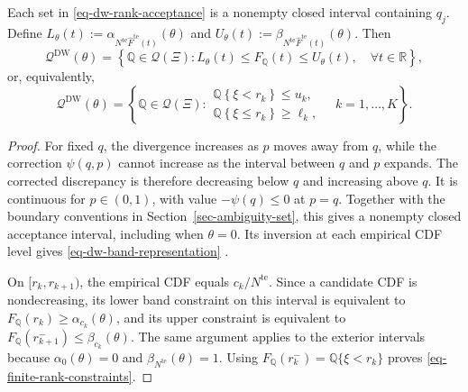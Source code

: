 \begin{proposition}
  \label{prop-finite-rank-constraints}
  Each set in \eqref{eq-dw-rank-acceptance} is a nonempty closed interval containing $q_j$. Define
  $L_\theta(t):=\alpha_{N^{\mathrm{te}}\widehat F^{\mathrm{te}}(t)}(\theta)$ and
  $U_\theta(t):=\beta_{N^{\mathrm{te}}\widehat F^{\mathrm{te}}(t)}(\theta)$.
  Then
  \begin{equation}
    \mathscr Q^{\mathrm{DW}}(\theta)
    =\left\{\mathbb Q\in\mathcal Q(\Xi):
    L_\theta(t)\le F_{\mathbb Q}(t)\le U_\theta(t),\quad\forall t\in\mathbb R\right\},
    \label{eq-dw-band-representation}
  \end{equation}
  or, equivalently,
  \begin{equation}
    \mathscr Q^{\mathrm{DW}}(\theta)
    =\left\{\mathbb Q\in\mathcal Q(\Xi):
    \begin{array}{l}
      \mathbb Q\left\{\xi<r_k\right\}\le u_k,\\
      \mathbb Q\left\{\xi\le r_k\right\}\ge\ell_k,
    \end{array}
    \quad k=1,\ldots,K\right\}.
    \label{eq-finite-rank-constraints}
  \end{equation}
\end{proposition}
\begin{proof}
  For fixed $q$, the divergence increases as $p$ moves away from $q$, while the correction $\psi(q,p)$ cannot increase as the interval between $q$ and $p$ expands. The corrected discrepancy is therefore decreasing below $q$ and increasing above $q$. It is continuous for $p\in(0,1)$, with value $-\psi(q)\le0$ at $p=q$. Together with the boundary conventions in Section~\ref{sec-ambiguity-set}, this gives a nonempty closed acceptance interval, including when $\theta=0$. Its inversion at each empirical CDF level gives \eqref{eq-dw-band-representation} \citep[Supplement, Section~S.6]{L.J23}.

  On $[r_k,r_{k+1})$, the empirical CDF equals $c_k/N^{\mathrm{te}}$. Since a candidate CDF is nondecreasing, its lower band constraint on this interval is equivalent to
  $F_{\mathbb Q}(r_k)\ge\alpha_{c_k}(\theta)$, and its upper constraint is equivalent to
  $F_{\mathbb Q}(r_{k+1}^-)\le\beta_{c_k}(\theta)$.
  The same argument applies to the exterior intervals because $\alpha_0(\theta)=0$ and $\beta_{N^{\mathrm{te}}}(\theta)=1$. Using
  $F_{\mathbb Q}(r_k^-)=\mathbb Q\{\xi<r_k\}$ proves \eqref{eq-finite-rank-constraints}.
\end{proof}


